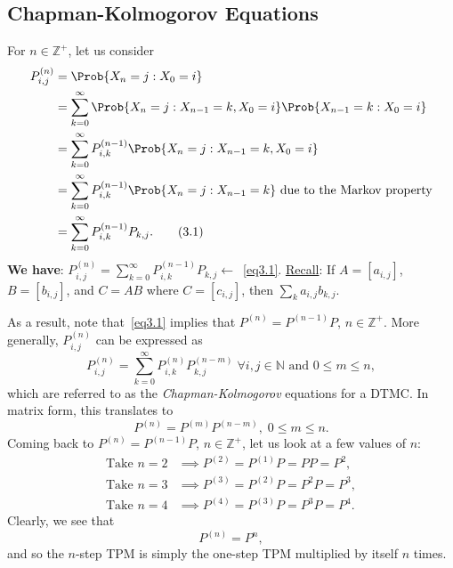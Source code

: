\subsection*{Chapman-Kolmogorov Equations}
\begin{Regular}
    For $ n\in\mathbb{Z}^+ $, let us consider
    \begin{align*}
        P_{i, j}^{(n)} & =\Prob{X_{n}=j \given X_{0}=i}                                                                           \\
                       & =\sum_{k=0}^{\infty} \Prob{X_{n}=j \given X_{n-1}=k, X_{0}=i} \Prob{X_{n-1}=k \given X_{0}=i}            \\
                       & =\sum_{k=0}^{\infty} P_{i, k}^{(n-1)} \Prob{X_{n}=j \given X_{n-1}=k, X_{0}=i}                           \\
                       & =\sum_{k=0}^{\infty} P_{i, k}^{(n-1)} \Prob{X_{n}=j \given X_{n-1}=k} \text{ due to the Markov property} \\
                       & =\sum_{k=0}^{\infty} P_{i,k}^{(n-1)} P_{k, j}.\label{eq3.1}\tag*{(3.1)}
    \end{align*}
    \textbf{We have}: $ P_{i,j}^{(n)}=\sum_{k=0}^{\infty} P_{i,k}^{(n-1)}P_{k,j}\leftarrow $~\ref{eq3.1}.
    \tcblower{}
    \underline{Recall}: If $ A=[a_{i,j}] $, $ B=[b_{i,j}] $, and $ C=AB $ where $ C=[c_{i,j}] $, then $ \sum_k a_{i,j}b_{k,j} $.

    As a result, note that~\ref{eq3.1} implies that $ P^{(n)}=P^{(n-1)}P $, $ n\in\mathbb{Z}^+ $. More generally, $ P_{i,j}^{(n)} $
    can be expressed as
    \[ P_{i,j}^{(n)}=\sum_{k=0}^{\infty} P_{i,k}^{(n)}P_{k,j}^{(n-m)}\; \forall i,j\in\mathbb{N}\text{ and }0\le m\le n, \]
    which are referred to as the \emph{Chapman-Kolmogorov} equations for a DTMC\@. In matrix form, this
    translates to
    \[ P^{(n)}=P^{(m)}P^{(n-m)},\; 0\le m\le n. \]
    Coming back to $ P^{(n)}=P^{(n-1)}P $, $ n\in\mathbb{Z}^+ $, let us look at a few values of $n$:
    \begin{align*}
        \text{Take }n=2 & \implies P^{(2)}=P^{(1)} P=P P=P^{2},     \\
        \text{Take }n=3 & \implies P^{(3)}=P^{(2)} P=P^{2} P=P^{3}, \\
        \text{Take }n=4 & \implies P^{(4)}=P^{(3)} P=P^{3} P=P^{4}.
    \end{align*}
    Clearly, we see that
    \[ P^{(n)}=P^n, \]
    and so the $ n $-step TPM is simply the one-step TPM multiplied by itself $ n $ times.
\end{Regular}
